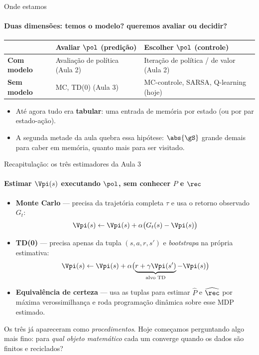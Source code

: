 \documentclass[aspectratio=169, 11pt]{beamer}
\newcommand{\Phat}{\widehat{P}}
\newcommand{\rhat}{\widehat{\rec}}
\begin{document}
\begin{frame}{Onde estamos}
  \framesubtitle{Duas dimensões: temos o modelo? queremos avaliar ou decidir?}

  \begin{center}\small
  \begin{tabular}{lll}
    \toprule
     & \textbf{Avaliar $\pol$} (predição) & \textbf{Escolher $\pol$} (controle) \\
    \midrule
    \textbf{Com modelo} & Avaliação de política (Aula 2) & Iteração de política / de valor (Aula 2) \\
    \addlinespace[0.3ex]
    \textbf{Sem modelo} & MC, TD(0) (Aula 3) & \alert{MC-controle, SARSA, Q-learning (hoje)} \\
    \bottomrule
  \end{tabular}
  \end{center}

  \medskip
  \begin{itemize}\setlength{\itemsep}{0.3ex}
    \item Até agora tudo era \textbf{tabular}: uma entrada de memória por
      estado (ou por par estado-ação).
    \item A segunda metade da aula quebra essa hipótese: $\abs{\gS}$ grande
      demais para caber em memória, quanto mais para ser visitado.
  \end{itemize}
\end{frame}

\begin{frame}{Recapitulação: os três estimadores da Aula 3}
  \framesubtitle{Estimar $\Vpi(s)$ executando $\pol$, sem conhecer $P$ e $\rec$}

  \begin{itemize}\setlength{\itemsep}{0.45ex}
    \item \textbf{Monte Carlo} — precisa da trajetória completa $\tau$ e usa
      o retorno observado $G_t$:
      \[ \Vpi(s) \leftarrow \Vpi(s) + \alpha\bigl(G_t(s) - \Vpi(s)\bigr) \]
    \item \textbf{TD(0)} — precisa apenas da tupla $(s,a,r,s')$ e
      \emph{bootstrapa} na própria estimativa:
      \[ \Vpi(s) \leftarrow \Vpi(s) + \alpha\bigl(\underbrace{r + \gamma \Vpi(s')}_{\text{alvo TD}} - \Vpi(s)\bigr) \]
    \item \textbf{Equivalência de certeza} — usa as tuplas para estimar
      $\Phat$ e $\rhat$ por máxima verossimilhança e roda programação
      dinâmica sobre esse MDP estimado.
  \end{itemize}

  \begin{ideiabox}
    Os três já apareceram como \emph{procedimentos}. Hoje começamos
    perguntando algo mais fino: para \emph{qual objeto matemático} cada um
    converge quando os dados são finitos e reciclados?
  \end{ideiabox}
\end{frame}
\end{document}

